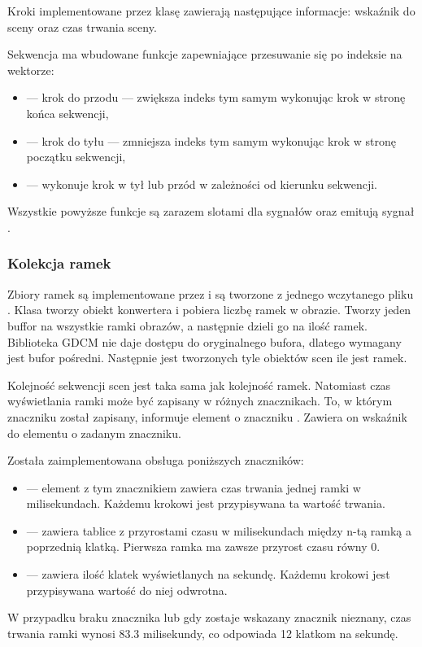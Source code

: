 \par
Kroki implementowane przez klasę  zawierają następujące informacje: wskaźnik do sceny oraz czas trwania sceny.

\par
Sekwencja ma wbudowane funkcje zapewniające przesuwanie się po indeksie na wektorze:
\begin{itemize}
    \item {} --- krok do przodu --- zwiększa indeks tym samym wykonując krok w stronę końca sekwencji,
    \item {} --- krok do tyłu --- zmniejsza indeks tym samym wykonując krok w stronę początku sekwencji,
    \item {} --- wykonuje krok w tył lub przód w zależności od kierunku sekwencji.
\end{itemize}
Wszystkie powyższe funkcje są zarazem slotami dla sygnałów oraz emitują sygnał .

\subsubsection{Kolekcja ramek \DICOM}
\label{sec:sokar-dicomframeset}

\par
Zbiory ramek są implementowane przez  i są tworzone z jednego wczytanego pliku \DICOM.
Klasa tworzy obiekt konwertera i pobiera liczbę ramek w obrazie.
Tworzy jeden buffor na wszystkie ramki obrazów, a następnie dzieli go na ilość ramek.
Biblioteka GDCM nie daje dostępu do oryginalnego bufora, dlatego wymagany jest bufor pośredni.
Następnie jest tworzonych tyle obiektów scen ile jest ramek.
\par
Kolejność sekwencji scen jest taka sama jak kolejność ramek.
Natomiast czas wyświetlania ramki może być zapisany w różnych znacznikach.
To, w którym znaczniku został zapisany, informuje element o znaczniku .
Zawiera on wskaźnik do elementu o zadanym znaczniku.
\par
Została zaimplementowana obsługa poniższych znaczników:
\begin{itemize}
    \item {} --- element z tym znacznikiem zawiera czas trwania jednej ramki w milisekundach.
          Każdemu krokowi jest przypisywana ta wartość trwania.

    \item {} --- zawiera tablice z przyrostami czasu w milisekundach między n-tą ramką a poprzednią klatką.
          Pierwsza ramka ma zawsze przyrost czasu równy 0.

    \item {} --- zawiera ilość klatek wyświetlanych na sekundę.
          Każdemu krokowi jest przypisywana wartość do niej odwrotna.
\end{itemize}
W przypadku braku znacznika lub gdy zostaje wskazany znacznik nieznany, czas trwania ramki wynosi $83.3$ milisekundy, co odpowiada 12 klatkom na sekundę.


